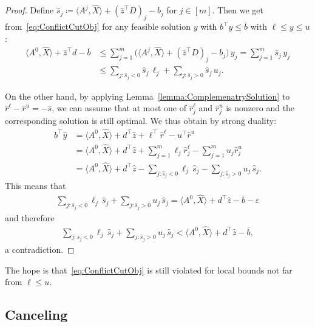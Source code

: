 \documentclass[10pt, a4paper]{article}
\newcommand{\define}{\coloneqq}
\newcommand{\skal}[2]{\langle{#1},{#2}\rangle}
\newcommand{\T}{^{\top}}
\begin{document}
\begin{proof}
  Define $\hat{s}_j \define \skal{A^j}{\hat{X}} + (\hat{z}\T D)_j - b_j$
  for $j \in [m]$. Then we get from~\eqref{eq:ConflictCutObj} for any
  feasible solution $y$ with $b\T y \leq \overline{b}$ with $\ell \leq y
  \leq u$:
  \begin{align*}
    \skal{A^0}{\hat{X}} + \hat{z}\T d - \overline{b} & \leq \sum_{j=1}^m \big(\skal{A^j}{\hat{X}} + (\hat{z}\T D)_j - b_j\big)\, y_j
    = \sum_{j=1}^m \hat{s}_j\, y_j\\
    & \leq \sum_{j: \hat{s}_j < 0} \hat{s}_j\, \ell_j +
        \sum_{j: \hat{s}_j > 0} \hat{s}_j\, u_j.
  \end{align*}

  On the other hand, by applying Lemma~\ref{lemma:ComplemenatrySolution} to
  $\hat{r}^\ell - \hat{r}^u = -\hat{s}$, we can assume that at most one of
  $\hat{r}^\ell_j$ and $\hat{r}^u_j$ is nonzero and the corresponding
  solution is still optimal. We thus obtain by strong duality:
  \begin{align*}
    b\T \hat{y} & = \skal{A^0}{\hat{X}} + d\T \hat{z} + \ell\T \hat{r}^\ell - u\T \hat{r}^u\\
      & = \skal{A^0}{\hat{X}} + d\T \hat{z} + \sum_{j=1}^m \ell_j \hat{r}^\ell_j -
        \sum_{j=1}^m u_j \hat{r}^u_j\\
      & = \skal{A^0}{\hat{X}}  + d\T \hat{z} - \sum_{j: \hat{s}_j < 0} \ell_j\, \hat{s}_j -
        \sum_{j: \hat{s}_j > 0} u_j\, \hat{s}_j.
  \end{align*}
  This means that
  \begin{align*}
    \sum_{j: \hat{s}_j < 0} \ell_j\, \hat{s}_j +
        \sum_{j: \hat{s}_j > 0} u_j\, \hat{s}_j = \skal{A^0}{\hat{X}}  +
    d\T \hat{z} - \overline{b} - \varepsilon
  \end{align*}
  and therefore
  \begin{align*}
    \sum_{j: \hat{s}_j < 0} \ell_j\, \hat{s}_j +
        \sum_{j: \hat{s}_j > 0} u_j\, \hat{s}_j < \skal{A^0}{\hat{X}}  +
    d\T \hat{z} - \overline{b},
  \end{align*}
  a contradiction.
\end{proof}

The hope is that~\eqref{eq:ConflictCutObj} is still violated for local
bounds not far from $\ell \leq u$.

\subsection{Canceling}
\label{sec:Canceling}
\end{document}
